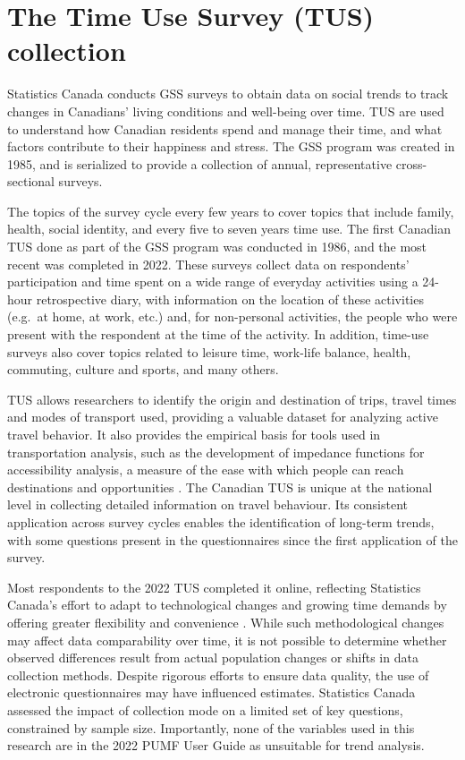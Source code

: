 \documentclass[Royal,times,sageh]{sagej}
\begin{document}
\section{The Time Use Survey (TUS)
collection}\label{the-time-use-survey-tus-collection}

Statistics Canada \citeyearpar{statisticscanada2024} conducts GSS
surveys to obtain data on social trends to track changes in Canadians'
living conditions and well-being over time. TUS are used to understand
how Canadian residents spend and manage their time, and what factors
contribute to their happiness and stress. The GSS program was created in
1985, and is serialized to provide a collection of annual,
representative cross-sectional surveys.

The topics of the survey cycle every few years to cover topics that
include family, health, social identity, and every five to seven years
time use. The first Canadian TUS done as part of the GSS program was
conducted in 1986, and the most recent was completed in 2022. These
surveys \citep{statisticscanada2022} collect data on respondents'
participation and time spent on a wide range of everyday activities
using a 24-hour retrospective diary, with information on the location of
these activities (e.g.~at home, at work, etc.) and, for non-personal
activities, the people who were present with the respondent at the time
of the activity. In addition, time-use surveys also cover topics related
to leisure time, work-life balance, health, commuting, culture and
sports, and many others.

TUS allows researchers to identify the origin and destination of trips,
travel times and modes of transport used, providing a valuable dataset
for analyzing active travel behavior. It also provides the empirical
basis for tools used in transportation analysis, such as the development
of impedance functions for accessibility analysis, a measure of the ease
with which people can reach destinations and opportunities
\citep{hansen1959}. The Canadian TUS is unique at the national level in
collecting detailed information on travel behaviour. Its consistent
application across survey cycles enables the identification of long-term
trends, with some questions present in the questionnaires since the
first application of the survey.

Most respondents to the 2022 TUS completed it online, reflecting
Statistics Canada's effort to adapt to technological changes and growing
time demands by offering greater flexibility and convenience
\citep{statisticscanada2022}. While such methodological changes may
affect data comparability over time, it is not possible to determine
whether observed differences result from actual population changes or
shifts in data collection methods. Despite rigorous efforts to ensure
data quality, the use of electronic questionnaires may have influenced
estimates. Statistics Canada assessed the impact of collection mode on a
limited set of key questions, constrained by sample size. Importantly,
none of the variables used in this research are in the 2022 PUMF User
Guide as unsuitable for trend analysis.
\end{document}
